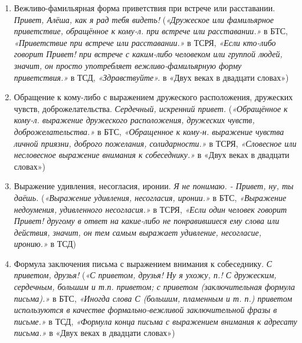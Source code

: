\begin{enumerate}
    \item Вежливо-фамильярная форма приветствия при встрече или расставании. \textit{Привет, Алёша, как я рад тебя видеть!}
(\textit{«Дружеское или фамильярное приветствие, обращённое к кому-л. при встрече или расставании.»} в БТС,
\textit{«Приветствие при встрече или расставании.»} в ТСРЯ,
\textit{«Если кто-либо говорит Привет! при встрече с каким-либо человеком или группой людей,
значит, он просто употребляет вежливо-фамильярную форму приветствия.»} в ТСД,
\textit{«Здравствуйте».} в «Двух веках в двадцати словах»)

    \item Обращение к кому-либо с выражением дружеского расположения, дружеских чувств, доброжелательства. \textit{Сердечный, искренний привет.}
(\textit{«Обращённое к кому-л. выражение дружеского расположения, дружеских чувств, доброжелательства.»} в БТС,
\textit{«Обращенное к кому-н. выражение чувства личной приязни, доброго пожелания, солидарности.»} в ТСРЯ,
\textit{«Словесное или несловесное выражение внимания к собеседнику.»} в «Двух веках в двадцати словах»)

    \item Выражение удивления, несогласия, иронии. \textit{Я не понимаю. - Привет, ну, ты даёшь.}
(\textit{«Выражение удивления, несогласия, иронии.»} в БТС,
\textit{«Выражение недоумения, удивленного несогласия.»} в ТСРЯ,
\textit{«Если один человек говорит Привет! другому в ответ на какие-либо
не понравившиеся ему слова или действия, значит, он тем самым выражает удивление, несогласие, иронию.»} в ТСД)

    \item Формула заключения письма с выражением внимания к собеседнику. \textit{С приветом, друзья!}
(\textit{«С приветом, друзья! Ну я ухожу, п.! С дружеским, сердечным, большим и т.п. приветом;
с приветом (заключительная формула письма).»} в БТС,
\textit{«Иногда слова С (большим, пламенным и т. п.) приветом используются в качестве
формально-вежливой заключительной фразы в письме.»} в ТСД,
\textit{«Формула конца письма с выражением внимания к адресату письма.»} в «Двух веках в двадцати словах»)



\end{enumerate}
